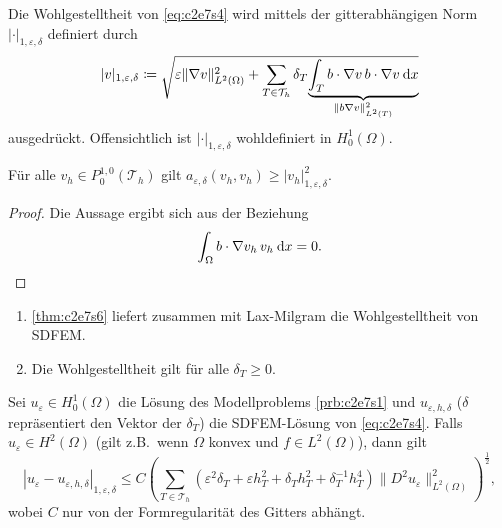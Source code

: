 \documentclass[../skript.tex]{subfiles}
\begin{document}
Die Wohlgestelltheit von \cref{eq:c2e7s4} wird mittels der gitterabhängigen Norm $|\cdot|_{1,\varepsilon,\delta}$ definiert durch
\[
	|v|_{1,\varepsilon,\delta} \coloneqq \sqrt{ \varepsilon\|\nabla v\|_{L^2(\Omega)}^2 + \sum_{T\in\mathcal{T}_h} \delta_T \smash[b]{ \underbrace{\int_T b\cdot\nabla v\,b\cdot\nabla v \dx}_{\|b\nabla v\|_{L^2(T)}^2} } } \vphantom{\underbrace{\int_T b\cdot\nabla v\,b\cdot\nabla v \dx}_{\|b\nabla v\|_{L^2(T)}^2} }
\]
ausgedrückt. Offensichtlich ist $|\cdot|_{1,\varepsilon,\delta}$ wohldefiniert in $H^1_0(\Omega)$.
\begin{theorem}\label{thm:c2e7s6}
	Für alle $v_h\in P^{1,0}_0(\mathcal{T}_h)$ gilt $a_{\varepsilon,\delta}(v_h,v_h)\geq |v_h|_{1,\varepsilon,\delta}^2$.
\end{theorem} 
\begin{proof}
	Die Aussage ergibt sich aus der Beziehung 
	\[
		\int_\Omega b\cdot\nabla v_h\,v_h\:\mathrm{d}x = 0.
	\]
\end{proof}
\begin{remark}\label{rem:c2e7s7}
	\begin{enumerate}
		\item \cref{thm:c2e7s6} liefert zusammen mit Lax-Milgram die Wohlgestelltheit von SDFEM.
		\item Die Wohlgestelltheit gilt für alle $\delta_T\geq 0$.
	\end{enumerate}
\end{remark}
\begin{theorem}\label{thm:c2e7s8}
	Sei $u_\varepsilon\in H^1_0(\Omega)$ die Lösung des Modellproblems \cref{prb:c2e7s1} und $u_{\varepsilon,h,\delta}$ ($\delta$ repräsentiert den Vektor der $\delta_T$) die SDFEM-Lösung von \cref{eq:c2e7s4}. Falls $u_\varepsilon\in H^2(\Omega)$ (gilt z.B.\ wenn $\Omega$ konvex und $f\in L^2(\Omega)$), dann gilt 
	\[
		|u_\varepsilon-u_{\varepsilon,h,\delta}|_{1,\varepsilon,\delta} \leq C\left( \sum_{T\in\mathcal{T}_h} (\varepsilon^2\delta_T + \varepsilon h_T^2+\delta_T h_T^2 + \delta_T^{-1}h_T^4 ) \|D^2u_\varepsilon\|_{L^2(\Omega)}^2\right)^{\frac{1}{2}},
	\]
	wobei $C$ nur von der Formregularität des Gitters abhängt. 
\end{theorem}
\end{document}
